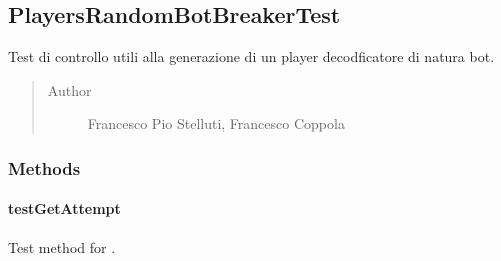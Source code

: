 \documentclass[letterpaper,10pt,italian,openany,oneside]{sphinxmanual}
\begin{document}
\subsection{PlayersRandomBotBreakerTest}
\label{\detokenize{test/it/unicam/cs/pa/mastermind/test/PlayersRandomBotBreakerTest:playersrandombotbreakertest}}\label{\detokenize{test/it/unicam/cs/pa/mastermind/test/PlayersRandomBotBreakerTest::doc}}

\begin{fulllineitems}
\label{\detokenize{test/it/unicam/cs/pa/mastermind/test/PlayersRandomBotBreakerTest:it.unicam.cs.pa.mastermind.test.PlayersRandomBotBreakerTest}}
Test di controllo utili alla generazione di un player decodficatore di natura bot.
\begin{quote}\begin{description}
\item[{Author}] \leavevmode
Francesco Pio Stelluti, Francesco Coppola

\end{description}\end{quote}

\end{fulllineitems}



\subsubsection{Methods}
\label{\detokenize{test/it/unicam/cs/pa/mastermind/test/PlayersRandomBotBreakerTest:methods}}

\paragraph{testGetAttempt}
\label{\detokenize{test/it/unicam/cs/pa/mastermind/test/PlayersRandomBotBreakerTest:testgetattempt}}

\begin{fulllineitems}
\label{\detokenize{test/it/unicam/cs/pa/mastermind/test/PlayersRandomBotBreakerTest:it.unicam.cs.pa.mastermind.test.PlayersRandomBotBreakerTest.testGetAttempt()}}
Test method for .

\end{fulllineitems}
\end{document}
